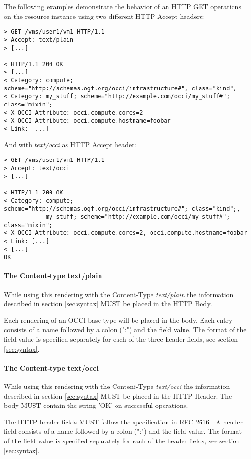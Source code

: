 \documentclass[10pt,a4paper]{article}
\begin{document}
The following examples demonstrate the behavior of an HTTP GET
operations on the resource instance \emph{} using two different HTTP
Accept headers:

\begin{verbatim}
> GET /vms/user1/vm1 HTTP/1.1
> Accept: text/plain
> [...]
 
< HTTP/1.1 200 OK
< [...]
< Category: compute; scheme="http://schemas.ogf.org/occi/infrastructure#"; class="kind";
< Category: my_stuff; scheme="http://example.com/occi/my_stuff#"; class="mixin"; 
< X-OCCI-Attribute: occi.compute.cores=2
< X-OCCI-Attribute: occi.compute.hostname=foobar
< Link: [...]
\end{verbatim}

And with \emph{text/occi} as HTTP Accept header:

\begin{verbatim}
> GET /vms/user1/vm1 HTTP/1.1
> Accept: text/occi
> [...]
 
< HTTP/1.1 200 OK
< Category: compute; scheme="http://schemas.ogf.org/occi/infrastructure#"; class="kind";,
            my_stuff; scheme="http://example.com/occi/my_stuff#"; class="mixin";
< X-OCCI-Attribute: occi.compute.cores=2, occi.compute.hostname=foobar
< Link: [...]
< [...]
OK
\end{verbatim}

\paragraph{The Content-type text/plain}
While using this rendering with the Content-Type \textit{text/plain}
the information described in section \ref{sec:syntax} MUST be placed
in the HTTP Body.

Each rendering of an OCCI base type will be placed in the body. Each
entry consists of a name followed by a colon (":") and the field
value. The format of the field value is specified separately for each
of the three header fields, see section \ref{sec:syntax}.

\paragraph{The Content-type text/occi}
While using this rendering with the Content-Type \textit{text/occi}
the information described in section \ref{sec:syntax} MUST be placed
in the HTTP Header. The body MUST contain the string 'OK' on
successful operations.

The HTTP header fields MUST follow the specification in RFC 2616
\cite{rfc2616}. A header field consists of a name followed by a colon
(":") and the field value. The format of the field value is specified
separately for each of the header fields, see section
\ref{sec:syntax}.
\end{document}
